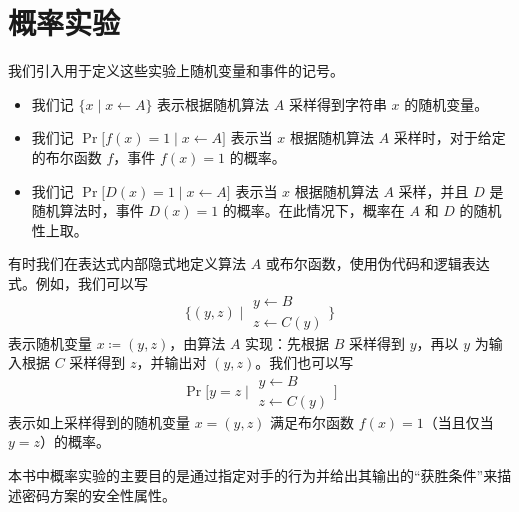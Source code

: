 \documentclass[american,singlepageview]{snargs-book-zh}
\newcommand{\DoQuote}[1]{``#1''}
\newcommand{\DefineEqual}{\coloneqq}
\newcommand{\GivenExperiment}{\;\vert\;}
\newcommand{\StateExperiment}[1]{
\!\begin{array}{l}
#1
\end{array}\!}
\begin{document}
\section{概率实验}
\label{section:probabilistic-experiments}

我们引入用于定义这些实验上随机变量和事件的记号。
\begin{itemize}

  \item 我们记
  $\{x \GivenExperiment x \gets A\}$
  表示根据随机算法 $A$ 采样得到字符串 $x$ 的随机变量。

  \item 我们记
  $\Pr\bigl[f(x)=1 \GivenExperiment x \gets A\bigr]$
  表示当 $x$ 根据随机算法 $A$ 采样时，对于给定的布尔函数 $f$，事件 $f(x)=1$ 的概率。

  \item 我们记
  $\Pr\bigl[D(x)=1 \GivenExperiment x \gets A\bigr]$
  表示当 $x$ 根据随机算法 $A$ 采样，并且 $D$ 是随机算法时，事件 $D(x)=1$ 的概率。在此情况下，概率在 $A$ 和 $D$ 的随机性上取。

\end{itemize}
有时我们在表达式内部隐式地定义算法 $A$ 或布尔函数，使用伪代码和逻辑表达式。例如，我们可以写
\begin{equation*}
\{(y,z) \GivenExperiment
\StateExperiment{
y \gets B \\
z \gets C(y)
}
\}
\end{equation*}
表示随机变量 $x \DefineEqual (y,z)$，由算法 $A$ 实现：先根据 $B$ 采样得到 $y$，再以 $y$ 为输入根据 $C$ 采样得到 $z$，并输出对 $(y,z)$。我们也可以写
\begin{equation*}
\Pr\bigl[y=z \GivenExperiment
\StateExperiment{
y \gets B \\
z \gets C(y)
}
\bigr]
\end{equation*}
表示如上采样得到的随机变量 $x=(y,z)$ 满足布尔函数 $f(x)=1$（当且仅当 $y=z$）的概率。

本书中概率实验的主要目的是通过指定对手的行为并给出其输出的\DoQuote{获胜条件}来描述密码方案的安全性属性。


\end{document}
